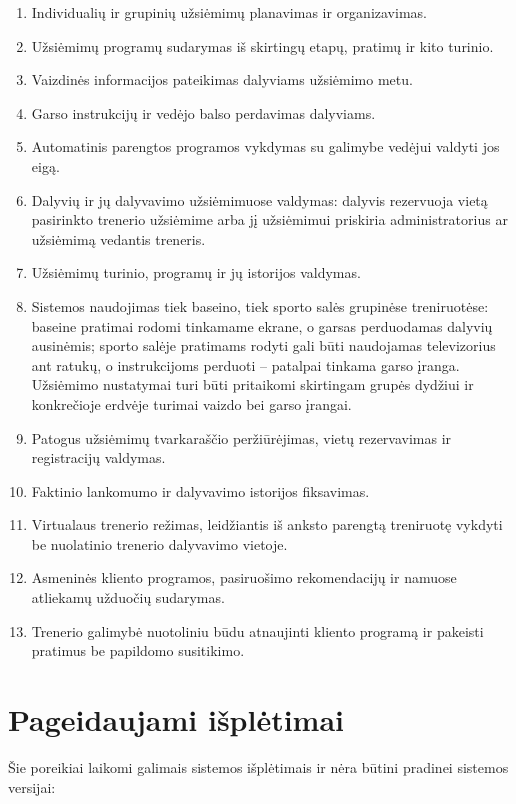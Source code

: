 \documentclass[a4paper,11pt]{article}
\begin{document}
\begin{enumerate}[label=\arabic*.]
    \item Individualių ir grupinių užsiėmimų planavimas ir organizavimas.
    \item Užsiėmimų programų sudarymas iš skirtingų etapų, pratimų ir kito turinio.
    \item Vaizdinės informacijos pateikimas dalyviams užsiėmimo metu.
    \item Garso instrukcijų ir vedėjo balso perdavimas dalyviams.
    \item Automatinis parengtos programos vykdymas su galimybe vedėjui valdyti jos eigą.
    \item Dalyvių ir jų dalyvavimo užsiėmimuose valdymas: dalyvis rezervuoja vietą pasirinkto trenerio užsiėmime arba jį užsiėmimui priskiria administratorius ar užsiėmimą vedantis treneris.
    \item Užsiėmimų turinio, programų ir jų istorijos valdymas.
    \item Sistemos naudojimas tiek baseino, tiek sporto salės grupinėse treniruotėse: baseine pratimai rodomi tinkamame ekrane, o garsas perduodamas dalyvių ausinėmis; sporto salėje pratimams rodyti gali būti naudojamas televizorius ant ratukų, o instrukcijoms perduoti -- patalpai tinkama garso įranga. Užsiėmimo nustatymai turi būti pritaikomi skirtingam grupės dydžiui ir konkrečioje erdvėje turimai vaizdo bei garso įrangai.
    \item Patogus užsiėmimų tvarkaraščio peržiūrėjimas, vietų rezervavimas ir registracijų valdymas.
    \item Faktinio lankomumo ir dalyvavimo istorijos fiksavimas.
    \item Virtualaus trenerio režimas, leidžiantis iš anksto parengtą treniruotę vykdyti be nuolatinio trenerio dalyvavimo vietoje.
    \item Asmeninės kliento programos, pasiruošimo rekomendacijų ir namuose atliekamų užduočių sudarymas.
    \item Trenerio galimybė nuotoliniu būdu atnaujinti kliento programą ir pakeisti pratimus be papildomo susitikimo.
\end{enumerate}

\section{Pageidaujami išplėtimai}

Šie poreikiai laikomi galimais sistemos išplėtimais ir nėra būtini pradinei sistemos versijai:
\end{document}
